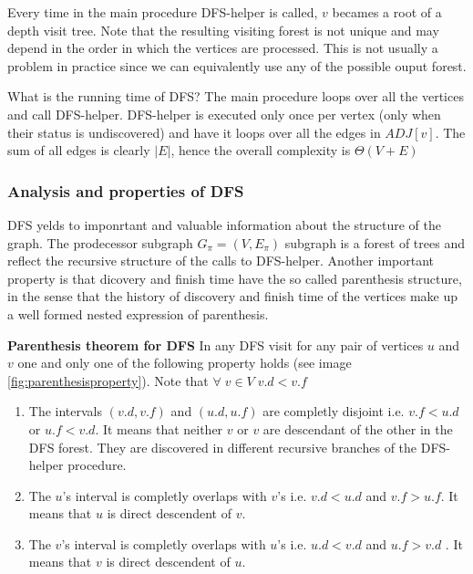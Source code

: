 Every time in the main procedure DFS-helper is called, $v$ becames a root of a depth visit tree.
Note that the resulting visiting forest  is not unique and may depend in the order in which the vertices are processed. This is not usually a problem in practice since we can equivalently use any of the possible ouput forest.

What is the running time of DFS? The main procedure loops over all the vertices and call DFS-helper.
DFS-helper is executed only once per vertex (only when their status is undiscovered) and have it loops over all the edges in $ADJ[v]$. The sum of all edges is clearly $|E|$, hence the overall complexity is $\Theta
(V+E)$

\subsubsection{Analysis and properties of DFS}
DFS yelds to imponrtant and valuable information about the structure of the graph. The prodecessor subgraph $G_{\pi} = (V,E_{\pi})$ subgraph is a forest of trees and reflect the recursive structure of the calls to DFS-helper.
Another important property is that dicovery and finish time have the so called parenthesis structure, in the sense that the history of discovery and finish time of the vertices make up a well formed nested expression of parenthesis.

\begin{theorem}{\textbf{Parenthesis theorem for DFS}}
In any DFS visit for any pair of vertices $u$ and $v$ one and only one of the following property holds (see image \ref{fig:parenthesisproperty}).
Note that $\forall \; v \in V \; v.d < v.f$
\begin{enumerate}
\item The intervals $(v.d,v.f)$ and  $(u.d,u.f)$ are completly disjoint i.e. $v.f < u.d$ or $u.f < v.d$. It means that neither $v$ or $v$ are descendant of the other in the DFS forest. They are discovered in different recursive branches of the DFS-helper procedure.
\item The $u$'s interval is completly overlaps with $v$'s i.e.  $v.d < u.d$ and $v.f > u.f$. It means that $u$ is direct descendent of $v$.
\item The $v$'s interval is completly overlaps with $u$'s i.e. $u.d < v.d$ and $u.f > v.d$ . It means that $v$ is direct descendent of $u$.
\end{enumerate}

\end{theorem}

